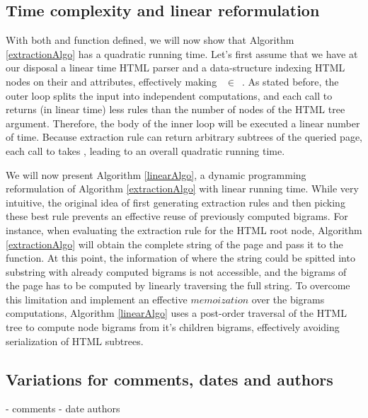 \similarityAlgo


\subsection{Time complexity and linear reformulation}
With both  and  function defined, we will now show that Algorithm \ref{extractionAlgo} has a quadratic running time. Let's first assume that we have at our disposal a linear time HTML parser and a data-structure indexing HTML nodes on their  and  attributes, effectively making ~$\in$~. As stated before, the outer loop splits the input into independent computations, and each call to  returns (in linear time) less rules than the number of nodes of the HTML tree argument. Therefore, the body of the inner loop will be executed a linear number of time. Because extraction rule can return arbitrary subtrees of the queried page, each call to  takes , leading to an overall quadratic running time.

\linearAlgo

We will now present Algorithm \ref{linearAlgo}, a dynamic programming reformulation of Algorithm \ref{extractionAlgo} with linear running time. While very intuitive, the original idea of first generating extraction rules and then picking these best rule prevents an effective reuse of previously computed bigrams. For instance, when evaluating the extraction rule for the HTML root node, Algorithm \ref{extractionAlgo} will obtain the complete string of the page and pass it to the  function. At this point, the information of where the string could be spitted into substring with already computed bigrams is not accessible, and the bigrams of the page has to be computed by linearly traversing the full string. To overcome this limitation and implement an effective $memoization$ over the bigrams computations, Algorithm \ref{linearAlgo} uses a post-order traversal of the HTML tree to compute node bigrams from it's children bigrams, effectively avoiding serialization of HTML subtrees.


\subsection{Variations for comments, dates and authors}
- comments
- date authors
